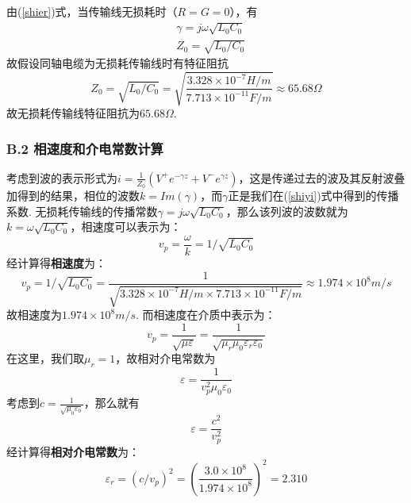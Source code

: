 \documentclass[UTF8]{ctexart}
\begin{document}
由(\ref{shier})式，当传输线无损耗时（$R=G=0$），有
\begin{equation}
   \begin{aligned}
   &\gamma=j\omega\sqrt{L_0C_0}\\
   &Z_0=\sqrt{L_0/C_0}
   \end{aligned}
   \label{shiwu}
\end{equation}
故假设同轴电缆为无损耗传输线时有特征阻抗
\begin{equation}
   Z_0=\sqrt{L_0/C_0}=\sqrt{\frac{3.328\times10^{-7}H/m}{7.713\times10^{-11}F/m}}\approx65.68\Omega
\end{equation}
故无损耗传输线特征阻抗为$65.68\Omega$.

\subsubsection*{B.2 相速度和介电常数计算}

考虑到波的表示形式为$i=\frac{1}{Z_0}(V^+e^{-\gamma z}+V^-e^{\gamma z})$，这是传递过去的波及其反射波叠加得到的结果，相位的波数$k=Im(\gamma)$，而$\gamma$正是我们在(\ref{shiyi})式中得到的传播系数. 无损耗传输线的传播常数$\gamma=j\omega\sqrt{L_0C_0}$，那么该列波的波数就为$k=\omega\sqrt{L_0C_0}$，相速度可以表示为：
\begin{equation}
   v_p=\frac{\omega}{k}=1/\sqrt{L_0C_0}
   \label{shiqi}
\end{equation}
经计算得\textbf{相速度}为：
\begin{equation}
   v_p=1/\sqrt{L_0C_0}=\frac{1}{\sqrt{3.328\times10^{-7}H/m\times 7.713\times10^{-11}F/m}}\approx1.974\times 10^8m/s
\end{equation}
故相速度为$1.974\times 10^8m/s$. 而相速度在介质中表示为：
\begin{equation}
    v_p=\frac{1}{\sqrt{\mu\varepsilon}}=\frac{1}{\sqrt{\mu_r\mu_0\varepsilon_r\varepsilon_0}}
\end{equation}
在这里，我们取$\mu_r=1$，故相对介电常数为
\begin{equation}
    \varepsilon=\frac{1}{v_p^2\mu_0\varepsilon_0}
\end{equation}
考虑到$c=\frac{1}{\sqrt{\mu_0\varepsilon_0}}$，那么就有
\begin{equation}
   \varepsilon=\frac{c^2}{v_p^2}
\end{equation}
经计算得\textbf{相对介电常数}为：
\begin{equation}
   \varepsilon_r=(c/v_p)^2=(\frac{3.0\times 10^8}{1.974\times 10^8})^2=2.310
\end{equation}
\end{document}
